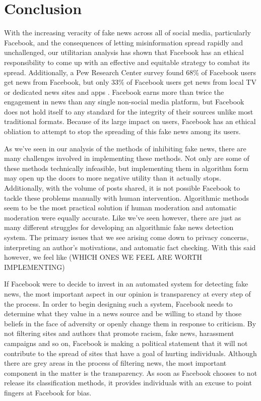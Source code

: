 \documentclass[12pt]{article}
\begin{document}
\section{Conclusion}

With the increasing veracity of fake news across all of social media, particularly Facebook, and the consequences of letting misinformation spread rapidly and unchallenged, our utilitarian analysis has shown that Facebook has an ethical responsibility to come up with an effective and equitable strategy to combat its spread. Additionally, a Pew Research Center survey found 68\% of Facebook users get news from Facebook, but only 33\% of Facebook users get news from local TV or dedicated news sites and apps \citep{pew_news}. Facebook earns more than twice the engagement in news than any single non-social media platform, but Facebook does not hold itself to any standard for the integrity of their sources unlike most traditional formats. Because of its large impact on users, Facebook has an ethical obliation to attempt to stop the spreading of this fake news among its users.

As we've seen in our analysis of the methods of inhibiting fake news, there are many challenges involved in implementing these methods. Not only are some of these methods technically infeasible, but implementing them in algorithm form may open up the doors to more negative utility than it actually stops. Additionally, with the volume of posts shared, it is not possible Facebook to tackle these problems manually with human intervention. Algorithmic methods seem to be the most practical solution if human moderation and automatic moderation were equally accurate. Like we've seen however, there are just as many different struggles for developing an algorithmic fake news detection system. The primary issues that we see arising come down to privacy concerns, interpreting an author's motivations, and automatic fact checking. With this said however, we feel like (WHICH ONES WE FEEL ARE WORTH IMPLEMENTING)

If Facebook were to decide to invest in an automated system for detecting fake news, the most important aspect in our opinion is transparency at every step of the process. In order to begin designing such a system, Facebook needs to determine what they value in a news source and be willing to stand by those beliefs in the face of adversity or openly change them in response to criticism. By not filtering sites and authors that promote racism, fake news, harassment campaigns and so on, Facebook is making a political statement that it will not contribute to the spread of sites that have a goal of hurting individuals. Although there are grey areas in the process of filtering news, the most important component in the matter is the transparency. As soon as Facebook chooses to not release its classification methods, it provides individuals with an excuse to point fingers at Facebook for bias. 

\newpage
%
%
\printbibliography
\end{document}
